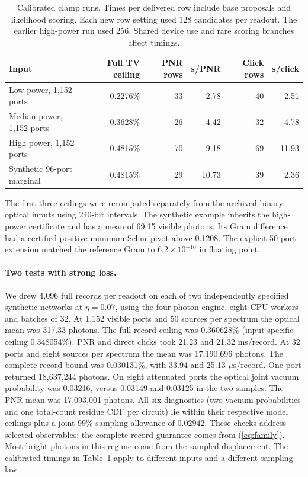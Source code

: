 \documentclass[11pt]{article}
\begin{document}
\begin{table}[ht]\centering\small
\caption{Calibrated clamp runs. Times per delivered row include base proposals and likelihood scoring. Each new row setting used 128 candidates per readout. The earlier high-power run used 256. Shared device use and rare scoring branches affect timings.}
\begin{tabular}{lrrrrr}\toprule
Input & Full TV ceiling & PNR rows & s/PNR & Click rows & s/click\\\midrule
Low power, 1,152 ports & 0.2276\% & 33 & 2.78 & 40 & 2.51\\
Median power, 1,152 ports & 0.3628\% & 26 & 4.42 & 32 & 4.78\\
High power, 1,152 ports & 0.4815\% & 70 & 9.18 & 69 & 11.93\\
Synthetic 96-port marginal & 0.4815\% & 29 & 10.73 & 39 & 2.36\\\bottomrule
\end{tabular}\label{tab:calfamily}
\end{table}
The first three ceilings were recomputed separately from the archived binary optical inputs using 240-bit intervals. The synthetic example inherits the high-power certificate and has a mean of 69.15 visible photons. Its Gram difference had a certified positive minimum Schur pivot above 0.1208. The explicit 50-port extension matched the reference Gram to $6.2\times10^{-16}$ in floating point.

\paragraph{Two tests with strong loss.}
We drew 4,096 full records per readout on each of two independently specified synthetic networks at $\eta=0.07$, using the four-photon engine, eight CPU workers and batches of 32. At 1,152 visible ports and 50 sources per spectrum the optical mean was 317.33 photons. The full-record ceiling was 0.360628\% (input-specific ceiling 0.348054\%). PNR and direct clicks took 21.23 and 21.32 ms/record. At 32 ports and eight sources per spectrum the mean was 17,190,696 photons. The complete-record bound was 0.030131\%, with 33.94 and 25.13 $\mu$s/record. One port returned 18,637,244 photons. On eight attenuated ports the optical joint vacuum probability was 0.03216, versus 0.03149 and 0.03125 in the two samples. The PNR mean was 17,093,001 photons. All six diagnostics (two vacuum probabilities and one total-count residue CDF per circuit) lie within their respective model ceilings plus a joint 99\% sampling allowance of 0.02942. These checks address selected observables; the complete-record guarantee comes from (\ref{eq:family}). Most bright photons in this regime come from the sampled displacement. The calibrated timings in Table~\ref{tab:calfamily} apply to different inputs and a different sampling law.
\end{document}
